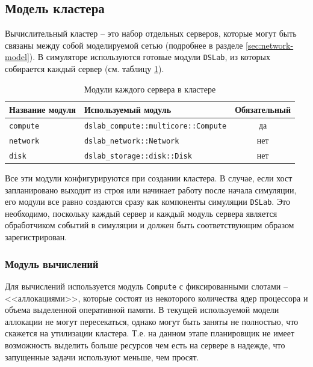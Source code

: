 \subsection{Модель кластера}\label{cluster-model}
Вычислительный кластер -- это набор отдельных серверов, которые могут быть связаны между собой моделируемой сетью (подробнее в разделе \ref{sec:network-model}). 
В симуляторе используются готовые модули \texttt{DSLab}, из которых собирается каждый сервер (см. таблицу \ref{tab:server_modules}). 
\begin{table}[h]
    \centering
    \begin{tabular}{|l|l|c|}
    \hline
    \textbf{Название модуля} & \textbf{Используемый модуль} & \textbf{Обязательный} \\
    \hline
    \texttt{compute} & \texttt{dslab\_compute::multicore::Compute} & да \\
    \hline
    \texttt{network} & \texttt{dslab\_network::Network} & нет  \\
    \hline
    \texttt{disk} & \texttt{dslab\_storage::disk::Disk} & нет \\
    \hline
    \end{tabular}
    \caption{Модули каждого сервера в кластере}
    \label{tab:server_modules}
\end{table}

Все эти модули конфигурируются при создании кластера. В случае, если хост запланировано выходит из строя или начинает работу после начала симуляции, его модули все равно создаются сразу как компоненты симуляции \texttt{DSLab}. Это необходимо, поскольку каждый сервер и каждый модуль сервера является обработчиком событий в симуляции и должен быть соответствующим образом зарегистрирован.

\subsubsection{Модуль вычислений}

Для вычислений используется модуль \texttt{Compute} с фиксированными слотами -- <<аллокациями>>, которые состоят из некоторого количества ядер процессора и объема выделенной оперативной памяти. В текущей используемой модели аллокации не могут пересекаться, однако могут быть заняты не полностью, что скажется на утилизации кластера. Т.е. на данном этапе планировщик не имеет возможность выделить больше ресурсов чем есть на сервере в надежде, что запущенные задачи используют меньше, чем просят. 

